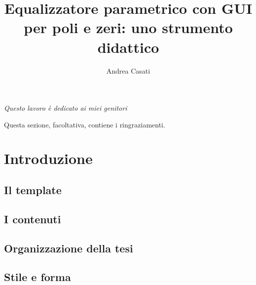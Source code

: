 \documentclass[12pt]{report}
\title{Equalizzatore parametrico con GUI per poli e zeri: uno strumento didattico}
\author{Andrea Casati}
\begin{document}
\makefrontpage

% 
%

{\raggedleft \large \sl Questo lavoro \`{e} dedicato ai miei genitori\\}

\clearpage
\beforepreface

% 
%


%
%

Questa sezione, facoltativa, contiene i ringraziamenti.

%
%

\afterpreface

% 
% 

\chapter{Introduzione}
\label{cap:introduzione}

\section{Il template}

\section{I contenuti}

\section{Organizzazione della tesi}

\section{Stile e forma}
\end{document}
